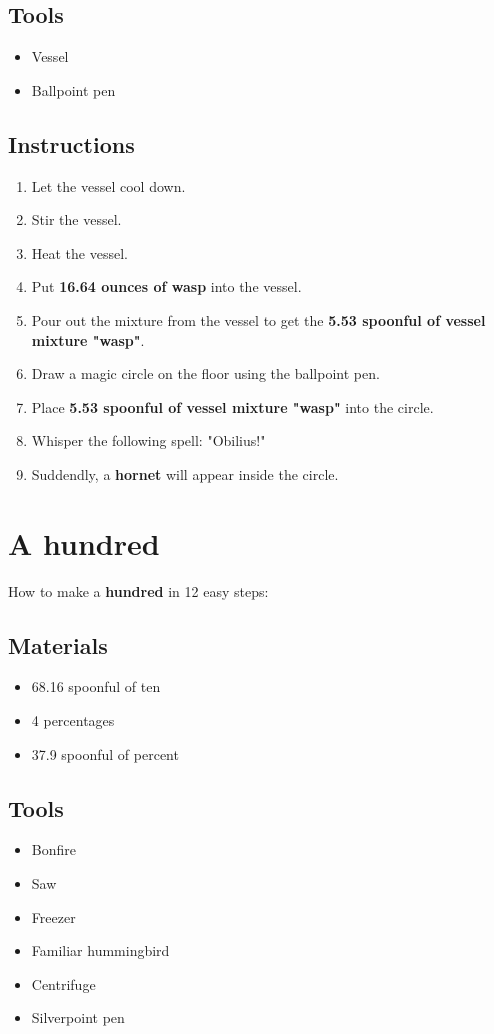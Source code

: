 \documentclass{article}
\begin{document}
\subsection{Tools}\begin{itemize}
\item 
Vessel
\item 
Ballpoint pen
\end{itemize}
\subsection{Instructions}\begin{enumerate}
\item 
Let the vessel cool down.
\item 
Stir the vessel.
\item 
Heat the vessel.
\item 
Put \textbf{16.64 ounces of wasp} into the vessel.
\item 
Pour out the mixture from the vessel to get the \textbf{5.53 spoonful of vessel mixture "wasp"}.
\item 
Draw a magic circle on the floor using the ballpoint pen.
\item 
Place \textbf{5.53 spoonful of vessel mixture "wasp"} into the circle.
\item 
Whisper the following spell: "Obilius!"
\item 
Suddendly, a \textbf{hornet} will appear inside the circle.
\end{enumerate}
\newpage
\section{A hundred}How to make a \textbf{hundred} in 12 easy steps:

\subsection{Materials}\begin{itemize}
\item 
68.16 spoonful of ten
\item 
4 percentages
\item 
37.9 spoonful of percent
\end{itemize}
\subsection{Tools}\begin{itemize}
\item 
Bonfire
\item 
Saw
\item 
Freezer
\item 
Familiar hummingbird
\item 
Centrifuge
\item 
Silverpoint pen
\end{itemize}
\end{document}
